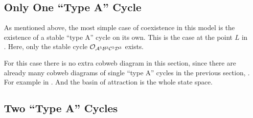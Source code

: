 \subsection{Only One ``Type A'' Cycle}
\label{sec:arch.coex.A}

As mentioned above, the most simple case of coexistence in this model is the existence of a stable ``type A'' cycle on its own.
This is the case at the point $L$ in .
Here, only the stable cycle $\mathcal{O}_{\mathcal{A}^5\mathcal{B}^3\mathcal{C}^5\mathcal{D}^3}$ exists.

For this case there is no extra cobweb diagram in this section, since there are already many cobweb diagrams of single ``type A'' cycles in the previous section, .
For example in .
And the basin of attraction is the whole state space.

\subsection{Two ``Type A'' Cycles}
\label{sec:arch.coex.AA}

